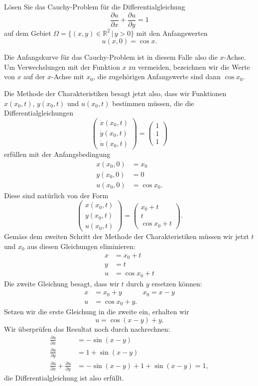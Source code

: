 Lösen Sie das Cauchy-Problem für die Differentialgleichung
\[
\frac{\partial u}{\partial x}
+
\frac{\partial u}{\partial y}
=1
\]
auf dem Gebiet $\Omega = \{ (x,y)\in\mathbb R^2\,|\, y > 0\}$
mit den Anfangswerten
\[
u(x,0)=\cos x.
\]

\begin{loesung}
Die Anfangskurve für das Cauchy-Problem ist in diesem Falle also die
$x$-Achse. Um Verwechslungen mit der Funktion $x$ zu vermeiden, bezeichnen
wir die Werte von $x$ auf der $x$-Achse mit $x_0$, die zugehörigen
Anfangswerte sind dann $\cos x_0$. 

Die Methode der Charakteristiken besagt jetzt also, dass wir Funktionen
$x(x_0, t)$, $y(x_0,t)$ und $u(x_0,t)$ bestimmen müssen, die die
Differentialgleichungen
\[
\begin{pmatrix}
\dot x(x_0,t)\\
\dot y(x_0,t)\\
\dot u(x_0,t)
\end{pmatrix}
=\begin{pmatrix}
1\\1\\1
\end{pmatrix}
\]
erfüllen mit der Anfangsbedingung
\begin{align*}
x(x_0,0)&=x_0\\
y(x_0,0)&=0\\
u(x_0,0)&=\cos x_0.
\end{align*}
Diese sind natürlich von der Form
\[
\begin{pmatrix}
x(x_0,t)\\
y(x_0,t)\\
u(x_0,t)
\end{pmatrix}
=
\begin{pmatrix}
x_0+t\\
t\\
\cos x_0 + t
\end{pmatrix}.
\]
Gemäss dem zweiten Schritt der Methode der Charakteristiken müssen
wir jetzt $t$ und $x_0$ aus diesen Gleichungen eliminieren:
\begin{align*}
x&=x_0+t\\
y&=t\\
u&=\cos x_0 + t
\end{align*}
Die zweite Gleichung besagt, dass wir $t$ durch $y$ ersetzen können:
\begin{align*}
x&=x_0+y&x_0=x-y\\
u&=\cos x_0 + y.
\end{align*}
Setzen wir die erste Gleichung in die zweite ein, erhalten wir
\[
u=\cos(x-y)+y.
\]
Wir überprüfen das Resultat noch durch nachrechnen:
\begin{align*}
\frac{\partial u}{\partial x}
&=
-\sin(x-y)
\\
\frac{\partial u}{\partial y}
&=
1+\sin(x-y)
\\
\frac{\partial u}{\partial x}
+
\frac{\partial u}{\partial y}
&=
-\sin(x-y)
+
1+\sin(x-y)
=1,
\end{align*}
die Differentialgleichung ist also erfüllt.
\end{loesung}

